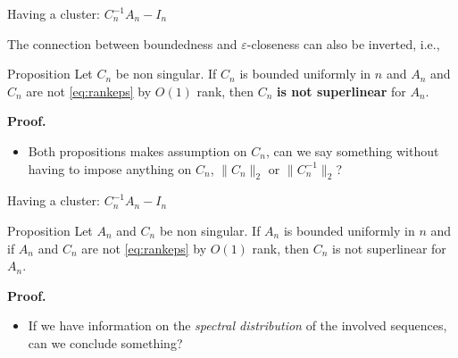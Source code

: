 \documentclass[aspectratio=169,xcolor=dvipsnames]{beamer}
\begin{document}
\begin{frame}{Having a cluster: $C_n^{-1}A_n - I_n$}

The connection between boundedness and $\varepsilon$-closeness can also be inverted, i.e.,
\begin{alertblock}{Proposition}
Let $C_n$ be non singular. If $C_n$ is bounded uniformly in $n$ and $A_n$ and $C_n$ are not \eqref{eq:rankeps} by $O(1)$ rank, then $C_n$ \textbf{is not superlinear} for $A_n$.
\end{alertblock}

\textbf{Proof.}  
\begin{itemize}
	\item[\faExclamationCircle] Both propositions makes assumption on $C_n$, can we say something without having to impose anything on $C_n$, $\|C_n\|_2$ or $\|C_n^{-1}\|_2$?
\end{itemize}

\end{frame}

\begin{frame}{Having a cluster: $C_n^{-1}A_n - I_n$}

\begin{alertblock}{Proposition}
Let $A_n$ and $C_n$ be non singular. If $A_n$ is bounded uniformly in $n$ and if $A_n$ and $C_n$ are not \eqref{eq:rankeps} by $O(1)$ rank, then $C_n$ is not superlinear for $A_n$.
\end{alertblock}

\textbf{Proof.}   
\begin{itemize}
	\item[\faQuestionCircle]<6-> If we have information on the \emph{spectral distribution} of the involved sequences, can we conclude something?
\end{itemize}

\end{frame}
\end{document}
